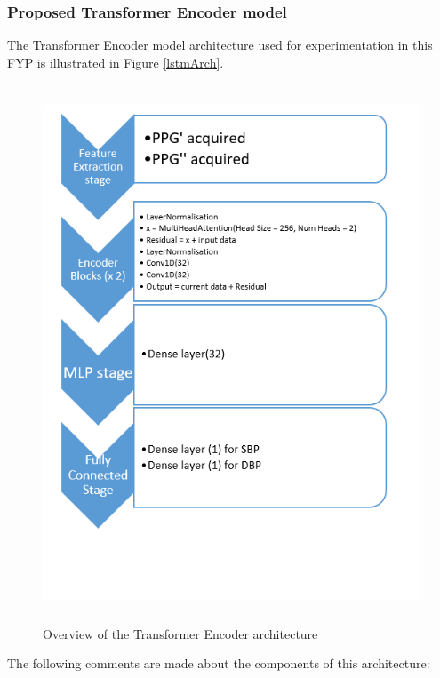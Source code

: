 \subsubsection{Proposed Transformer Encoder model}
The Transformer Encoder model architecture used for experimentation in this FYP is illustrated in Figure \ref{lstmArch}.
\begin{figure}[H]
    \centering
    \includegraphics[width=16cm,height=16cm,keepaspectratio]{Implementation/transformerArch.png}
    \caption{Overview of the Transformer Encoder architecture}
    \label{transformerArch}
\end{figure}\noindent The following comments are made about the components of this architecture:
